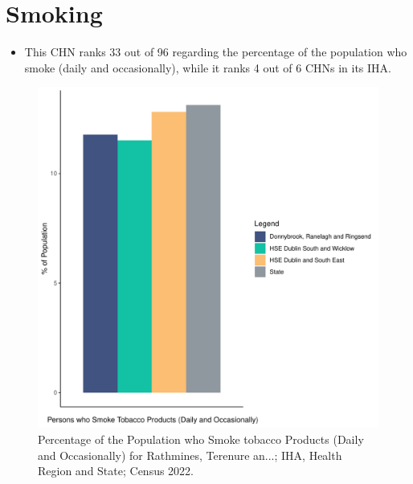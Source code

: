 \documentclass{article}
\begin{document}
\pagebreak

\section{Smoking}\label{sect:Smoking}
\begin{itemize}
\item This CHN ranks  33 out of 96 regarding the percentage of the population who smoke (daily and occasionally), while it ranks   4 out of 6 CHNs in its IHA.
\end{itemize}
\begin{figure}[H]
	\centering
	\includegraphics[width = 120mm]{../figures/SmokingED.pdf}
	\caption{Percentage of the Population who Smoke tobacco Products (Daily and Occasionally) for Rathmines, Terenure an...; IHA, Health Region and State; Census 2022.}
	\label{fig:2ae19629-1a6a-13a3-e055-000000000001}
	\end{figure}
	
\end{document}
